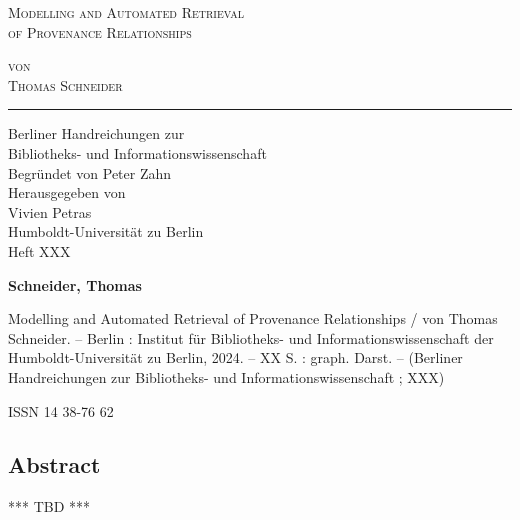 \documentclass[paper=a4,11pt,twoside,parskip=half-]{scrreprt} %
\begin{document}
\clearpage{\thispagestyle{empty}\cleardoublepage}
\clearpage{\thispagestyle{empty}\cleardoublepage}
\centering
\phantom{x}
\vspace{5cm}

{\Large \scshape Modelling and Automated Retrieval \\ of Provenance Relationships \par}

\vspace{4cm}

{\Large \scshape von \\ Thomas Schneider \par}

\vspace{3cm}
\hrule
\vspace{1cm}
\raggedleft
{\Large Berliner Handreichungen zur \\
Bibliotheks- und Informationswissenschaft \\
\vspace{1cm}
Begründet von Peter Zahn \\
Herausgegeben von \\
Vivien Petras \\
Humboldt-Universität zu Berlin \\
\vspace{.5cm}
Heft XXX} %

\newpage
\thispagestyle{empty}
\justifying
\phantom{x}
\vspace{.5cm}

{ \large \textbf{Schneider, Thomas} \par

Modelling and Automated Retrieval of Provenance Relationships
/ von Thomas Schneider. -- Berlin : Institut für Bibliotheks- und Informationswissenschaft
der Humboldt-Universität zu Berlin, 2024. -- XX S. : graph. Darst. -- (Berliner Handreichungen zur Bibliotheks- und Informationswissenschaft
; XXX) \par %

 ISSN 14 38-76 62 \par} %


\vspace*{\fill}
\subsection*{\textrm{\foreignlanguage{english}{Abstract}}}
*** TBD ***
\end{document}
